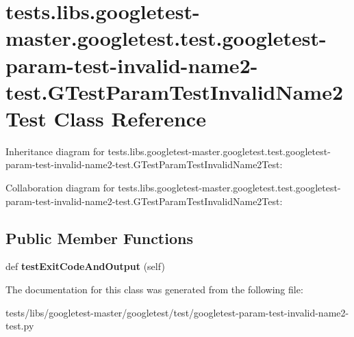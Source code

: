 \hypertarget{classtests_1_1libs_1_1googletest-master_1_1googletest_1_1test_1_1googletest-param-test-invalid-n83d036e049e85e629e26143b2ed2d363}{}\section{tests.\+libs.\+googletest-\/master.googletest.\+test.\+googletest-\/param-\/test-\/invalid-\/name2-\/test.G\+Test\+Param\+Test\+Invalid\+Name2\+Test Class Reference}
\label{classtests_1_1libs_1_1googletest-master_1_1googletest_1_1test_1_1googletest-param-test-invalid-n83d036e049e85e629e26143b2ed2d363}


Inheritance diagram for tests.\+libs.\+googletest-\/master.googletest.\+test.\+googletest-\/param-\/test-\/invalid-\/name2-\/test.G\+Test\+Param\+Test\+Invalid\+Name2\+Test\+:


Collaboration diagram for tests.\+libs.\+googletest-\/master.googletest.\+test.\+googletest-\/param-\/test-\/invalid-\/name2-\/test.G\+Test\+Param\+Test\+Invalid\+Name2\+Test\+:
\subsection*{Public Member Functions}
\begin{DoxyCompactItemize}
\item 
\mbox{\label{classtests_1_1libs_1_1googletest-master_1_1googletest_1_1test_1_1googletest-param-test-invalid-n83d036e049e85e629e26143b2ed2d363_a622b22eebfa9f9ef96e3750024afef4d}} 
def {\bfseries test\+Exit\+Code\+And\+Output} (self)
\end{DoxyCompactItemize}


The documentation for this class was generated from the following file\+:\begin{DoxyCompactItemize}
\item 
tests/libs/googletest-\/master/googletest/test/googletest-\/param-\/test-\/invalid-\/name2-\/test.\+py\end{DoxyCompactItemize}
